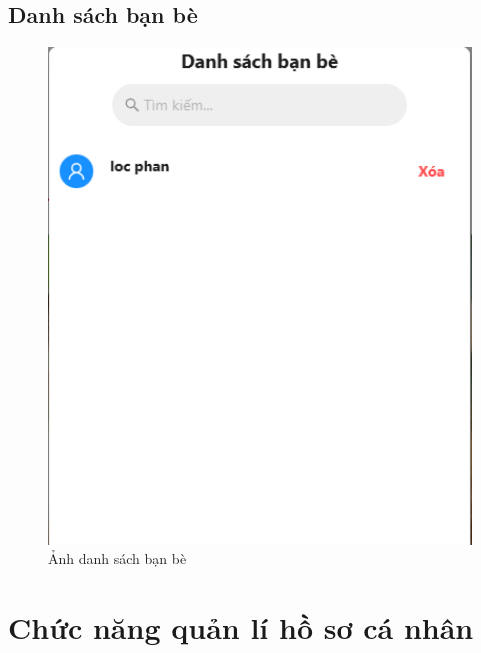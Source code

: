 \subsection{Danh sách bạn bè}
\begin{figure}[H]
    \centering
    \includegraphics[width=1\textwidth]{img/instagram/danh_sach_ban_be.png}
    \caption{Ảnh danh sách bạn bè}
\end{figure}

\FloatBarrier %


\section{Chức năng quản lí hồ sơ cá nhân}
